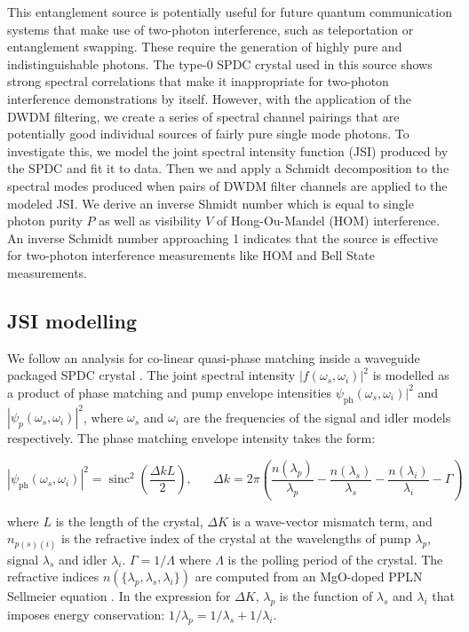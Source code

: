 \documentclass[11pt]{caltech_thesis} %
\begin{document}
This entanglement source is potentially useful for future quantum communication systems that make use of two-photon interference, such as teleportation or entanglement swapping. These require the generation of highly pure and indistinguishable photons. The type-0 SPDC crystal used in this source shows strong spectral correlations that make it inappropriate for two-photon interference demonstrations by itself. However, with the application of the DWDM filtering, we create a series of spectral channel pairings that are potentially good individual sources of fairly pure single mode photons. To investigate this, we model the joint spectral intensity function (JSI) produced by the SPDC and fit it to data. Then we and apply a Schmidt decomposition to the spectral modes produced when pairs of DWDM filter channels are applied to the modeled JSI. We derive an inverse Shmidt number which is equal to single photon purity $P$ as well as visibility $V$ of Hong-Ou-Mandel (HOM) interference. An inverse Schmidt number approaching 1 indicates that the source is effective for two-photon interference measurements like HOM and Bell State measurements.

\hypertarget{jsi-modelling}{%
\subsection{JSI modelling}\label{jsi-modelling}}

We follow an analysis for co-linear quasi-phase matching inside a waveguide packaged SPDC crystal \autocite{Davis2022,ZielnickiKwiat2018SPDCmodel}. The joint spectral intensity $|f(\omega_s, \omega_i)|^2$ is modelled as a product of phase matching and pump envelope intensities \textbar{}$\psi_{\mathrm{ph}}\left(\omega_s, \omega_i\right)|^2$ and $|\psi_p\left(\omega_s, \omega_i\right)|^2$, where $\omega_s$ and $\omega_i$ are the frequencies of the signal and idler models respectively. The phase matching envelope intensity takes the form:

$$
\left|\psi_{\mathrm{ph}}\left(\omega_s, \omega_i\right)\right|^2=\operatorname{sinc}^2\left(\frac{\Delta k L}{2}\right),\;\;\;\;\;\; \Delta k=2 \pi\left(\frac{n\left(\lambda_p\right)}{\lambda_p}-\frac{n\left(\lambda_s\right)}{\lambda_s}-\frac{n\left(\lambda_i\right)}{\lambda_i}-\Gamma\right)
$$

where $L$ is the length of the crystal, $\Delta K$ is a wave-vector mismatch term, and $n_{p(s)(i)}$ is the refractive index of the crystal at the wavelengths of pump $\lambda_p$, signal $\lambda_s$ and idler $\lambda_i$. $\Gamma = 1/\Lambda$ where $\Lambda$ is the polling period of the crystal. The refractive indices $n(\{\lambda_p, \lambda_s, \lambda_i\})$ are computed from an MgO-doped PPLN Sellmeier equation \autocite{Gayer2008}. In the expression for $\Delta K$, $\lambda_p$ is the function of $\lambda_s$ and $\lambda_i$ that imposes energy conservation: $1/\lambda_p = 1/\lambda_s + 1/\lambda_i$.
\end{document}
